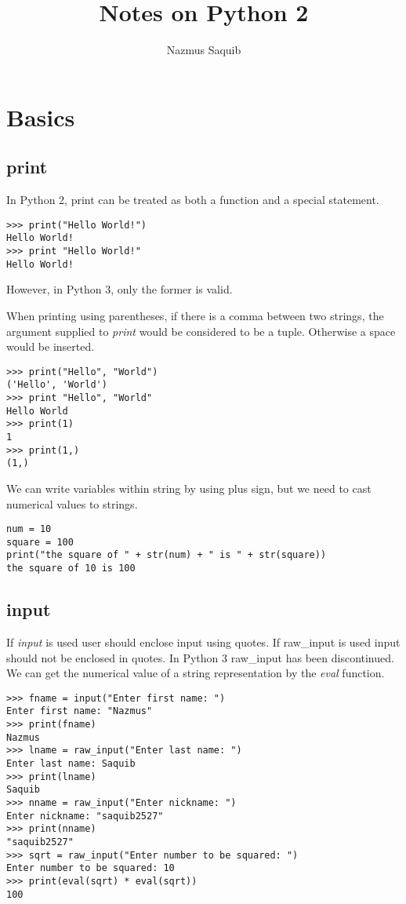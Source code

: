 \documentclass[a4paper, 12pt]{article}
\begin{document}
\title{Notes on Python 2}
\author{Nazmus Saquib}

\maketitle
\tableofcontents

\section{Basics}

\subsection{print}
In Python 2, print can be treated as both a function and a special statement.
\begin{verbatim}
>>> print("Hello World!")
Hello World!
>>> print "Hello World!"
Hello World!
\end{verbatim}
However, in Python 3, only the former is valid.

When printing using parentheses, if there is a comma between two strings, the argument supplied to \emph{print} would be considered to be a tuple. Otherwise a space would be inserted.
\begin{verbatim}
>>> print("Hello", "World")
('Hello', 'World')
>>> print "Hello", "World"
Hello World
>>> print(1)
1
>>> print(1,)
(1,)
\end{verbatim}

We can write variables within string by using plus sign, but we need to cast numerical values to strings.
\begin{verbatim}
num = 10
square = 100
print("the square of " + str(num) + " is " + str(square))
the square of 10 is 100
\end{verbatim}


\subsection{input}
If \emph{input} is used user should enclose input using quotes. If raw\_input is used input should not be enclosed in quotes.
In Python 3 raw\_input has been discontinued. We can get the numerical value of a string representation by the \emph{eval} function.
\begin{verbatim}
>>> fname = input("Enter first name: ")
Enter first name: "Nazmus"
>>> print(fname)
Nazmus
>>> lname = raw_input("Enter last name: ")
Enter last name: Saquib
>>> print(lname)
Saquib
>>> nname = raw_input("Enter nickname: ")
Enter nickname: "saquib2527"
>>> print(nname)
"saquib2527"
>>> sqrt = raw_input("Enter number to be squared: ")
Enter number to be squared: 10
>>> print(eval(sqrt) * eval(sqrt))
100
\end{verbatim}
\end{document}
